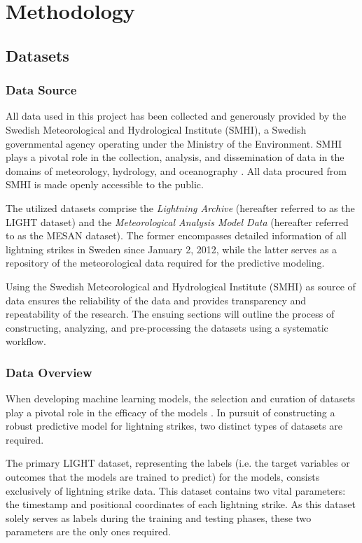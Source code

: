 \chapter{Methodology}
\label{sec:method}

\section{Datasets}
\label{sec:datasets}

\subsection{Data Source}
\label{sec:sources-of-data}

All data used in this project has been collected and generously provided by the Swedish Meteorological and Hydrological Institute (SMHI), a Swedish governmental agency operating under the Ministry of the Environment. SMHI plays a pivotal role in the collection, analysis, and dissemination of data in the domains of meteorology, hydrology, and oceanography \cite{about-smhi}. All data procured from SMHI is made openly accessible to the public.

The utilized datasets comprise the \textit{Lightning Archive} (hereafter referred to as the LIGHT dataset) and the \textit{Meteorological Analysis Model Data} (hereafter referred to as the MESAN dataset). The former encompasses detailed information of all lightning strikes in Sweden since January 2, 2012, while the latter serves as a repository of the meteorological data required for the predictive modeling.

Using the Swedish Meteorological and Hydrological Institute (SMHI) as source of data ensures the reliability of the data and provides transparency and repeatability of the research. The ensuing sections will outline the process of constructing, analyzing, and pre-processing the datasets using a systematic workflow.

\subsection{Data Overview}

When developing machine learning models, the selection and curation of datasets play a pivotal role in the efficacy of the models \cite{data-quality}. In pursuit of constructing a robust predictive model for lightning strikes, two distinct types of datasets are required.

The primary LIGHT dataset, representing the labels (i.e. the target variables or outcomes that the models are trained to predict) for the models, consists exclusively of lightning strike data. This dataset contains two vital parameters: the timestamp and positional coordinates of each lightning strike. As this dataset solely serves as labels during the training and testing phases, these two parameters are the only ones required.

